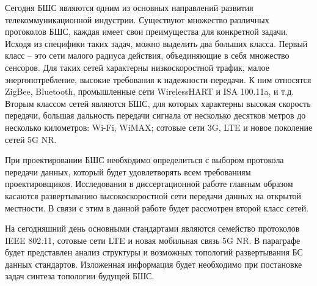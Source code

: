 
Сегодня БШС являются одним из основных направлений развития телекоммуникационной индустрии. Существуют множество различных протоколов БШС, каждая имеет свои преимущества для конкретной задачи. Исходя из специфики таких задач, можно выделить два больших класса. Первый класс -- это сети малого радиуса действия, объединяющие в себя множество сенсоров. Для таких сетей характерны низкоскоростной трафик, малое энергопотребление, высокие требования к надежности передачи. К ним относятся ZigBee, Bluetooth, промышленные сети WirelessHART и ISA 100.11a, и т.д.  Вторым классом сетей являются БШС, для которых  характерны высокая скорость передачи, большая дальность передачи сигнала от несколько десятков метров до несколько километров: Wi-Fi, WiMAX; сотовые сети 3G, LTE и новое поколение сетей 5G NR.

При проектировании БШС необходимо определиться с выбором протокола передачи данных, который будет удовлетворять всем требованиям проектировщиков. Исследования в диссертационной работе главным образом касаются развертыванию высокоскоростной сети передачи данных на открытой местности. В связи с этим в данной работе будет рассмотрен второй класс сетей. 

На сегодняшний день основными стандартами являются семейство протоколов IEEE 802.11, сотовые сети LTE и новая мобильная связь 5G NR. В параграфе будет представлен анализ структуры и возможных топологий развертывания БС данных стандартов. Изложенная информация будет необходимо при постановке задач синтеза топологии будущей БШС.





